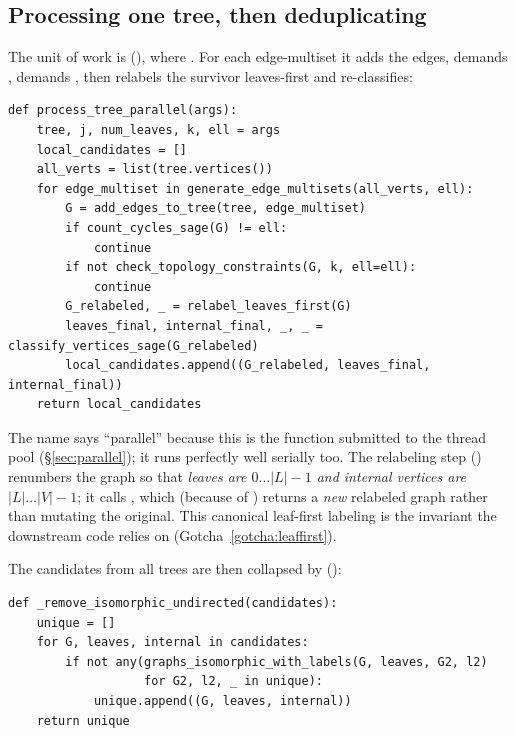 \subsection{Processing one tree, then deduplicating}

The unit of work is 
(), where . For each edge-multiset it adds the edges, demands
, demands ,
then relabels the survivor leaves-first and re-classifies:

\begin{lstlisting}
def process_tree_parallel(args):
    tree, j, num_leaves, k, ell = args
    local_candidates = []
    all_verts = list(tree.vertices())
    for edge_multiset in generate_edge_multisets(all_verts, ell):
        G = add_edges_to_tree(tree, edge_multiset)
        if count_cycles_sage(G) != ell:
            continue
        if not check_topology_constraints(G, k, ell=ell):
            continue
        G_relabeled, _ = relabel_leaves_first(G)
        leaves_final, internal_final, _, _ = classify_vertices_sage(G_relabeled)
        local_candidates.append((G_relabeled, leaves_final, internal_final))
    return local_candidates
\end{lstlisting}

The name says ``parallel'' because this is the function submitted to the thread
pool (\S\ref{sec:parallel}); it runs perfectly well serially too. The relabeling
step  ()
renumbers the graph so that \emph{leaves are $0\ldots|L|-1$ and internal vertices
are $|L|\ldots|V|-1$}; it calls , which
(because of ) returns a \emph{new} relabeled graph rather than
mutating the original. This canonical leaf-first labeling is the invariant the
downstream code relies on (Gotcha~\ref{gotcha:leaffirst}).

The candidates from all trees are then collapsed by
 ():

\begin{lstlisting}
def _remove_isomorphic_undirected(candidates):
    unique = []
    for G, leaves, internal in candidates:
        if not any(graphs_isomorphic_with_labels(G, leaves, G2, l2)
                   for G2, l2, _ in unique):
            unique.append((G, leaves, internal))
    return unique
\end{lstlisting}

